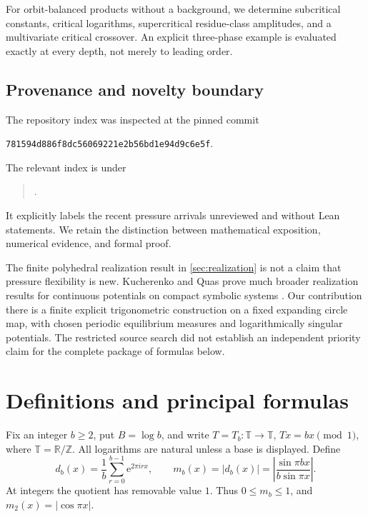 \documentclass[11pt,a4paper]{article}
\numberwithin{equation}{section}
\theoremstyle{definition}
\theoremstyle{remark}
\newcommand{\TT}{\mathbb T}
\newcommand{\RR}{\mathbb R}
\newcommand{\ZZ}{\mathbb Z}
\newcommand{\ee}{\mathrm e}
\begin{document}
For orbit-balanced products without a background, we determine
subcritical constants, critical logarithms, supercritical residue-class
amplitudes, and a multivariate critical crossover. An explicit
three-phase example is evaluated exactly at every depth, not merely to
leading order.

\subsection{Provenance and novelty boundary}
The repository index was inspected at the pinned commit
\begin{center}\small\nolinkurl{781594d886f8dc56069221e2b56bd1e94d9c6e5f}.\end{center}
The relevant index is under
\begin{quote}\small
{}.
\end{quote}
It explicitly labels the recent pressure arrivals unreviewed and without
Lean statements. We retain the distinction between mathematical
exposition, numerical evidence, and formal proof.

The finite polyhedral realization result in \cref{sec:realization} is
not a claim that pressure flexibility is new. Kucherenko and Quas prove
much broader realization results for continuous potentials on compact
symbolic systems \cite{KQ}. Our contribution there is a finite explicit
trigonometric construction on a fixed expanding circle map, with chosen
periodic equilibrium measures and logarithmically singular potentials.
The restricted source search did not establish an independent priority
claim for the complete package of formulas below.

\section{Definitions and principal formulas}
\label{sec:definitions}
Fix an integer $b\ge2$, put $B=\log b$, and write
$T=T_b\colon\TT\to\TT$, $Tx=bx\pmod1$, where $\TT=\RR/\ZZ$.
All logarithms are natural unless a base is displayed. Define
\begin{equation}
 d_b(x)=\frac1b\sum_{r=0}^{b-1}\ee^{2\pi i r x},\qquad
 m_b(x)=|d_b(x)|=
 \left|\frac{\sin\pi bx}{b\sin\pi x}\right|.
 \label{eq:mask}
\end{equation}
At integers the quotient has removable value $1$.
Thus $0\le m_b\le1$, and $m_2(x)=|\cos\pi x|$.
\end{document}
